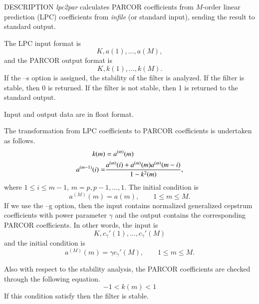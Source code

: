 \begin{qsection}{DESCRIPTION}
{\em lpc2par} calculates PARCOR coefficients 
from $M$-order linear prediction (LPC) coefficients 
from {\em infile} (or standard input), 
sending the result to standard output.

The LPC input format is
\begin{displaymath}
  K, a(1),\dots, a(M), 
\end{displaymath}
and the PARCOR output format is
\begin{displaymath}
  K, k(1),\dots, k(M).
\end{displaymath}
If the --s option is assigned, the stability of the filter is analyzed.
If the filter is stable, then 0 is returned.
If the filter is not stable, then 1 is returned to the standard output.
\par
Input and output data are in float format.
\par
The transformation from LPC coefficients to PARCOR coefficients
is undertaken as follows.
\begin{align} 
k(m) &= a^{(m)}(m) \notag \\
a^{(m-1)}(i) =& \frac{a^{(m)}(i)+a^{(m)}(m)a^{(m)}(m-i)}{1-k^2(m)}, \notag
\end{align}
where $1 \leq i \leq m-1$, $m=p, p-1, \dots, 1$.
The initial condition is
\begin{displaymath}
a^{(M)}(m) = a(m), \qquad 1 \leq m \leq M.
\end{displaymath}
If we use the --g option, then the input contains normalized generalized
cepstrum coefficients with power parameter $\gamma$
and the output contains the corresponding PARCOR coefficients.
In other words, the input is 
\begin{displaymath}
K,c_\gamma'(1),\dots,c_\gamma'(M)
\end{displaymath}
and the initial condition is
\begin{displaymath}
a^{(M)}(m) = \gamma c_\gamma'(M), \qquad 1 \leq m \leq M.
\end{displaymath}

Also with respect to the stability analysis,
the PARCOR coefficients are checked through the following equation.
\begin{displaymath}
-1 < k(m) < 1
\end{displaymath}
If this condition satisfy then the filter is stable.

\end{qsection}

\begin{options}
\end{options}

